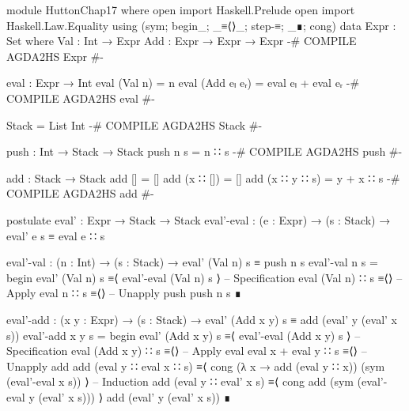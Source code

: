 \documentclass{article}
\begin{document}
\begin{code}
module HuttonChap17 where
open import Haskell.Prelude
open import Haskell.Law.Equality using (sym; begin_; _≡⟨⟩_; step-≡; _∎; cong)
data Expr : Set where
    Val : Int → Expr
    Add : Expr → Expr → Expr
{-# COMPILE AGDA2HS Expr #-}

eval : Expr → Int
eval (Val n) = n
eval (Add eₗ eᵣ) = eval eₗ + eval eᵣ
{-# COMPILE AGDA2HS eval #-}

Stack = List Int
{-# COMPILE AGDA2HS Stack #-}

push : Int → Stack → Stack
push n s = n ∷ s
{-# COMPILE AGDA2HS push #-}

add : Stack → Stack
add [] = []
add (x ∷ []) = []
add (x ∷ y ∷ s) = y + x ∷ s
{-# COMPILE AGDA2HS add #-}

postulate
  eval' : Expr → Stack → Stack
  eval'-eval : (e : Expr) → (s : Stack) → eval' e s ≡ eval e ∷ s

eval'-val : (n : Int) → (s : Stack)
  → eval' (Val n) s ≡ push n s
eval'-val n s =
  begin
    eval' (Val n) s
  ≡⟨ eval'-eval (Val n) s ⟩ -- Specification
    eval (Val n) ∷ s
  ≡⟨⟩ -- Apply eval
    n ∷ s
  ≡⟨⟩ -- Unapply push
    push n s
  ∎
\end{code}
\begin{code}
eval'-add : (x y : Expr) → (s : Stack)
  → eval' (Add x y) s ≡ add (eval' y (eval' x s))
eval'-add x y s =
  begin
    eval' (Add x y) s
  ≡⟨ eval'-eval (Add x y) s ⟩ -- Specification
    eval (Add x y) ∷ s
  ≡⟨⟩ -- Apply eval
    eval x + eval y ∷ s
  ≡⟨⟩ -- Unapply add
    add (eval y ∷ eval x ∷ s)
  ≡⟨ cong (λ x → add (eval y ∷ x)) (sym (eval'-eval x s)) ⟩ -- Induction
    add (eval y ∷ eval' x s)
  ≡⟨ cong add (sym (eval'-eval y (eval' x s))) ⟩
    add (eval' y (eval' x s))
  ∎
\end{code}   
\end{document}
